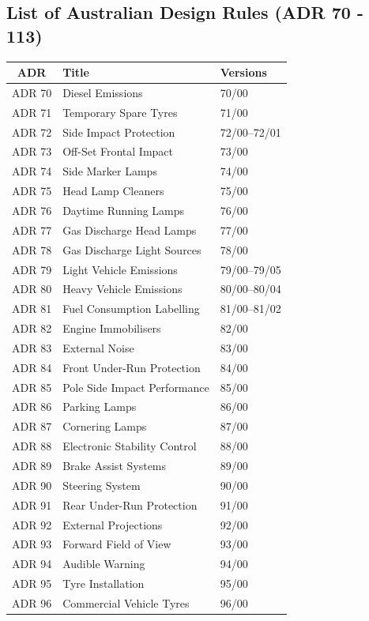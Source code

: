     \subsection{List of Australian Design Rules (ADR 70 - 113)}
        \begin{table}[h]
            \centering
            \renewcommand{\arraystretch}{1.2}
            \begin{tabularx}{\textwidth}{|c|X|X|}
            \hline
            \textbf{ADR} & \textbf{Title} & \textbf{Versions} \\
            \hline
            
            ADR 70 & Diesel Emissions & 70/00 \\
            ADR 71 & Temporary Spare Tyres & 71/00 \\
            ADR 72 & Side Impact Protection & 72/00–72/01 \\
            ADR 73 & Off-Set Frontal Impact & 73/00 \\
            ADR 74 & Side Marker Lamps & 74/00 \\
            ADR 75 & Head Lamp Cleaners & 75/00 \\
            ADR 76 & Daytime Running Lamps & 76/00 \\
            ADR 77 & Gas Discharge Head Lamps & 77/00 \\
            ADR 78 & Gas Discharge Light Sources & 78/00 \\
            
            ADR 79 & Light Vehicle Emissions & 79/00–79/05 \\
            ADR 80 & Heavy Vehicle Emissions & 80/00–80/04 \\
            ADR 81 & Fuel Consumption Labelling & 81/00–81/02 \\
            ADR 82 & Engine Immobilisers & 82/00 \\
            ADR 83 & External Noise & 83/00 \\
            ADR 84 & Front Under-Run Protection & 84/00 \\
            ADR 85 & Pole Side Impact Performance & 85/00 \\
            ADR 86 & Parking Lamps & 86/00 \\
            ADR 87 & Cornering Lamps & 87/00 \\
            
            ADR 88 & Electronic Stability Control & 88/00 \\
            ADR 89 & Brake Assist Systems & 89/00 \\
            ADR 90 & Steering System & 90/00 \\
            ADR 91 & Rear Under-Run Protection & 91/00 \\
            ADR 92 & External Projections & 92/00 \\
            ADR 93 & Forward Field of View & 93/00 \\
            ADR 94 & Audible Warning & 94/00 \\
            ADR 95 & Tyre Installation & 95/00 \\
            ADR 96 & Commercial Vehicle Tyres & 96/00 \\
            

\end{tabularx}
\end{table}
